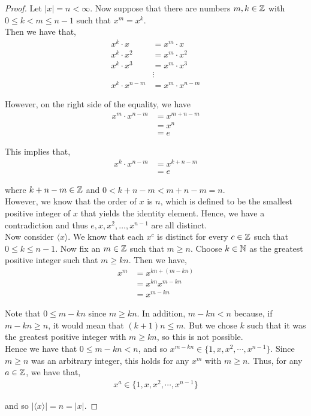 \documentclass[11pt, reqno]{amsart}
\theoremstyle{plain}
\theoremstyle{definition}
\theoremstyle{example}
\begin{document}
\begin{proof}
Let $|x| = n < \infty$. Now suppose that there are numbers $m, k \in \mathbb{Z}$ with $0 \leq k < m \leq n-1$ such that $x^m = x^k$.\\

Then we have that,
\begin{align*}
x^k \cdot x &= x^m \cdot x\\
x^k \cdot x^2 &= x^m \cdot x^2\\
x^k \cdot x^3 &= x^m \cdot x^3\\
&\vdots\\
x^k \cdot x^{n-m} &= x^m \cdot x^{n-m}
\end{align*}

However, on the right side of the equality, we have
\begin{align*}
x^m \cdot x^{n-m} &= x^{m+n-m}\\
&= x^n\\
&= e
\end{align*}

This implies that,
\begin{align*}
x^k \cdot x^{n-m} &= x^{k+n-m}\\
&= e
\end{align*}

where $k+n-m \in \mathbb{Z}$ and $0 < k+n-m < m+n-m = n$.\\

However, we know that the order of $x$ is $n$, which is defined to be the smallest positive integer of $x$ that yields the identity element. Hence, we have a contradiction and thus $e, x, x^2, \dots, x^{n-1}$ are all distinct.\\

Now consider $\langle x \rangle$. We know that each $x^c$ is distinct for every $c \in \mathbb{Z}$ such that $0 \leq k \leq n-1$. Now fix an $m \in \mathbb{Z}$ such that $m \geq n$. Choose $k \in \mathbb{N}$ as the greatest positive integer such that $m \geq kn$. Then we have,
\begin{align*}
x^m &= x^{kn + (m - kn)}\\
&= x^{kn}x^{m - kn}\\
&= x^{m-kn}
\end{align*}

Note that $0 \leq m - kn$ since $m \geq kn$. In addition, $m - kn < n$ because, if $m - kn \geq n$, it would mean that $(k+1)n \leq m$. But we chose $k$ such that it was the greatest positive integer with $m \geq kn$, so this is not possible.\\

Hence we have that $0 \leq m - kn < n$, and so $x^{m - kn} \in \{1, x, x^2, \cdots, x^{n-1}\}$. Since $m \geq n$ was an arbitrary integer, this holds for any $x^m$ with $m \geq n$. Thus, for any $a \in \mathbb{Z}$, we have that,
\begin{align*}
x^a \in \{1, x, x^2, \cdots, x^{n-1}\}
\end{align*} 

and so $| \langle x \rangle | = n = |x|$.
\end{proof}
\end{document}
